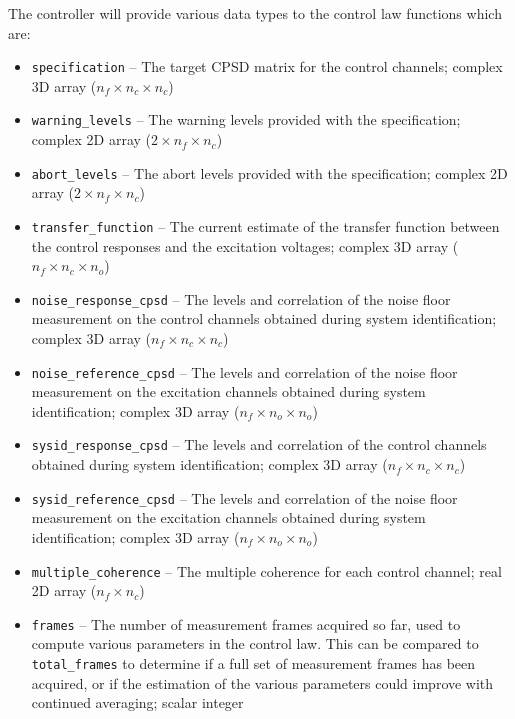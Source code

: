 \documentclass[pdf,12pt,report]{SANDreport}
\newcommand{\inlineCode}{\lstinline[basicstyle=\bfseries\ttfamily]}
\begin{document}
    The controller will provide various data types to the control law functions which are:
    \begin{itemize}
        \item \inlineCode{specification} -- The target \Ac{CPSD} matrix for the control channels; complex 3D array ($n_f \times n_c \times n_c$)
        
        \item \inlineCode{warning_levels} -- The warning levels provided with the specification; complex 2D array ($2 \times n_f \times n_c$)
        
        \item \inlineCode{abort_levels} -- The abort levels provided with the specification; complex 2D array ($2 \times n_f \times n_c$)
        
        \item \inlineCode{transfer_function} -- The current estimate of the transfer function between the control responses and the excitation voltages; complex 3D array ($n_f \times n_c \times n_o$)
        
        \item \inlineCode{noise_response_cpsd} -- The levels and correlation of the noise floor measurement on the control channels obtained during system identification; complex 3D array ($n_{f} \times n_{c}\times n_{c}$)
        
        \item \inlineCode{noise_reference_cpsd} -- The levels and correlation of the noise floor measurement on the excitation channels obtained during system identification; complex 3D array ($n_{f} \times n_{o}\times n_{o}$)
        
        \item \inlineCode{sysid_response_cpsd} -- The levels and correlation of the control channels obtained during system identification; complex 3D array ($n_{f} \times n_{c}\times n_{c}$)

        \item \inlineCode{sysid_reference_cpsd} -- The levels and correlation of the noise floor measurement on the excitation channels obtained during system identification; complex 3D array ($n_{f} \times n_{o}\times n_{o}$)
        
        \item \inlineCode{multiple_coherence} -- The multiple coherence for each control channel; real 2D array ($n_f \times n_c$)
        
        \item \inlineCode{frames} -- The number of measurement frames acquired so far, used to compute various parameters in the control law.  This can be compared to \inlineCode{total_frames} to determine if a full set of measurement frames has been acquired, or if the estimation of the various parameters could improve with continued averaging; scalar integer
        

\end{itemize}
\end{document}
